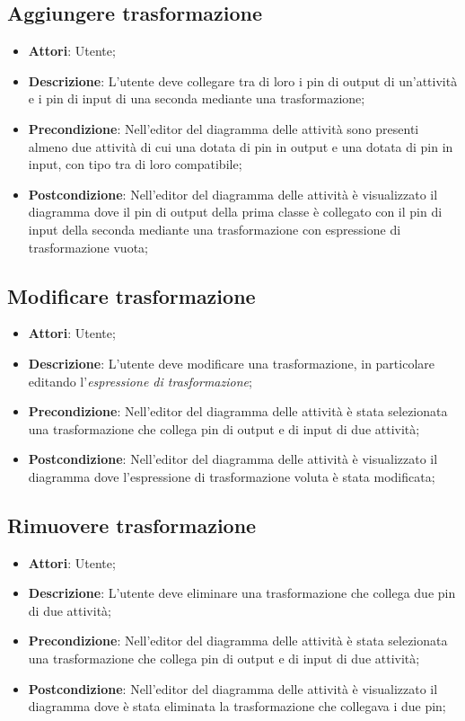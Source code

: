 \documentclass[../AnalisiDeiRequisiti.tex]{subfiles}
\begin{document}
	\subsection{Aggiungere trasformazione}
	\begin{itemize}
		\item \textbf{Attori}: Utente;
		\item \textbf{Descrizione}: L’utente deve collegare tra di loro i pin di output di un’attività e i pin di input di una seconda mediante una trasformazione;
		\item \textbf{Precondizione}: Nell'editor del diagramma delle attività sono presenti almeno due attività di cui una dotata di pin in output e una dotata di pin in input, con tipo tra di loro compatibile;
		\item \textbf{Postcondizione}: Nell'editor del diagramma delle attività è visualizzato il diagramma dove il pin di output della prima classe è collegato con il pin di input della seconda mediante una trasformazione con espressione di trasformazione vuota;
	\end{itemize}

	\subsection{Modificare trasformazione}
	\begin{itemize}
		\item \textbf{Attori}: Utente;
		\item \textbf{Descrizione}: L’utente deve modificare una trasformazione, in particolare editando l’\textit{espressione di trasformazione};
		\item \textbf{Precondizione}: Nell'editor del diagramma delle attività è stata selezionata una trasformazione che collega pin di output e di input di due attività;
		\item \textbf{Postcondizione}: Nell'editor del diagramma delle attività è visualizzato il diagramma dove l’espressione di trasformazione voluta è stata modificata;
	\end{itemize}

	\subsection{Rimuovere trasformazione}
	\begin{itemize}
		\item \textbf{Attori}: Utente;
		\item \textbf{Descrizione}: L’utente deve eliminare una trasformazione che collega due pin di due attività;
		\item \textbf{Precondizione}: Nell'editor del diagramma delle attività è stata selezionata una trasformazione che collega pin di output e di input di due attività;
		\item \textbf{Postcondizione}: Nell'editor del diagramma delle attività è visualizzato il diagramma dove è stata eliminata la trasformazione che collegava i due pin;
	\end{itemize}
		
\end{document}
